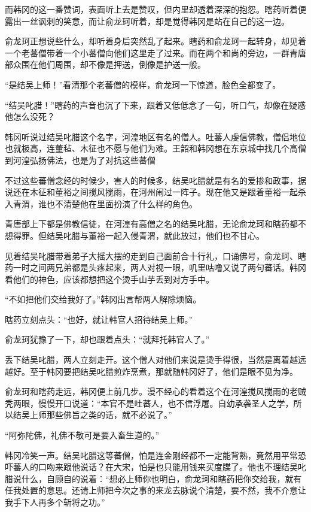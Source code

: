 而韩冈的这一番赞词，表面听上去是赞叹，但内里却透着深深的抱怨。瞎药听着便露出一丝讽刺的笑意，而让俞龙珂听着，却是觉得韩冈是站在自己的这一边。

俞龙珂正想说些什么，却听着身后突然乱了起来。瞎药和俞龙珂一起转身，却见着一个老蕃僧带着一个小蕃僧向他们这里走了过来。而在两个和尚的旁边，一群青唐部众围在他们周围，却不像是押送，倒像是护送一般。

“是结吴上师！”看清那个老蕃僧的模样，俞龙珂一下惊道，脸色全都变了。

“结吴叱腊！”瞎药的声音也沉了下来，跟着又低低念了一句，听口气，却像在疑惑他怎么没死？

韩冈听说过结吴叱腊这个名字，河湟地区有名的僧人。吐蕃人虔信佛教，僧侣地位也就极高，连董毡、木征也不愿与他们为难。王韶和韩冈想在东京城中找几个高僧到河湟弘扬佛法，也是为了对抗这些蕃僧

不过这些蕃僧念经的时候少，害人的时候多，结吴叱腊就是有名的爱掺和政事，据说还在木征和董裕之间搅风搅雨，在河州闹过一阵子。现在他又是跟着董裕一起杀入青渭，谁也不清楚他在里面扮演了什么样的角色。

青唐部上下都是佛教信徒，在河湟有高僧之名的结吴叱腊，无论俞龙珂和瞎药都不想得罪。但结吴叱腊与董裕一起入侵青渭，就此放过，他们也不甘心。

见着结吴叱腊带着弟子大摇大摆的走到自己面前合十行礼，口诵佛号，俞龙珂、瞎药一时之间两兄弟都是头疼起来，两人对视一眼，叽里咕噜又说了两句蕃话。韩冈看他们的神色，应该都想把这个烫手山芋丢到对方手中。

“不如把他们交给我好了。”韩冈出言帮两人解除烦恼。

瞎药立刻点头：“也好，就让韩官人招待结吴上师。”

俞龙珂犹豫了一下，却也跟着点头：“就拜托韩官人了。”

丢下结吴叱腊，两人立刻走开。这个僧人对他们来说是烫手得很，当然是离着越远越好。至于韩冈要把结吴叱腊煎炸烹煮，那就随韩冈好了，他们是眼不见为净。

俞龙珂和瞎药走远，韩冈便上前几步。漫不经心的看着这个在河湟搅风搅雨的老贼秃两眼，慢慢开口说道：“本官不是吐蕃人，也不信浮屠。自幼承袭圣人之学，所以结吴上师那些佛旨之类的话，就不必说了。”

“阿弥陀佛，礼佛不敬可是要入畜生道的。”

韩冈冷笑一声。结吴叱腊这等蕃僧，怕是连金刚经都不一定能背熟，竟然用平常恐吓蕃人的口吻来跟他说话？在大宋，怕是也只能用钱来买度牒了。他也不理结吴叱腊说什么，自顾自的说着：“想必上师你也明白，俞龙珂和瞎药把你交给我，就有任我处置的意思。还请上师把今次之事的来龙去脉说个清楚，要不然，我不介意让我手下人再多个斩将之功。”


